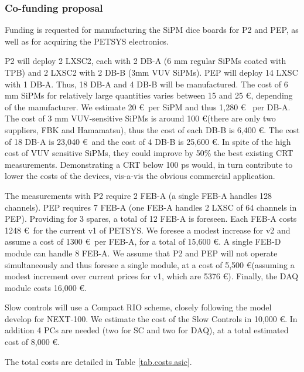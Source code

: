 \subsubsection*{Co-funding proposal}
Funding is requested for manufacturing the SiPM dice boards for P2 and PEP, as well as for acquiring the PETSYS
electronics. 

P2 will deploy 2 LXSC2, each with 2 DB-A (6 mm regular SiPMs coated with TPB) and 2 LXSC2 with 2 DB-B (3mm VUV SiPMs). PEP will deploy 14 LXSC with 1 DB-A. Thus, 18 DB-A and 4 DB-B  will be manufactured. The cost of 6 mm SiPMs for relatively large quantities varies between 15 and 25 \euro, depending of the manufacturer. We estimate 20 \euro ~per SiPM and thus 1,280 \euro 
~per DB-A. The cost of 3 mm VUV-sensitive SiPMs is around 100 \euro (there are only two suppliers, FBK and Hamamatsu), thus the cost of each DB-B is 6,400 \euro. The cost of 18 DB-A is 23,040 \euro\ and the cost
of 4 DB-B is 25,600 \euro. In spite of the high cost of VUV sensitive SiPMs, they could improve by 50\% the best existing CRT measurements. Demonstrating a CRT below 100 ps would, in turn contribute to lower the costs of the devices, vis-a-vis the obvious commercial application.

The measurements with P2 require 2 FEB-A (a single FEB-A handles 128 channels). PEP requires 7 FEB-A (one FEB-A handles 2 LXSC of 64 channels in PEP). Providing for 3 spares, a total of 12 FEB-A is foreseen. Each FEB-A costs 1248 \euro\ for the current v1 of PETSYS. We foresee a modest increase for v2 and assume a cost of 1300 \euro\ per FEB-A, for a total of 15,600 \euro. A single FEB-D module can handle 8 FEB-A. We assume that P2 and PEP will not operate simultaneously and thus foresee a single module, at a cost of 5,500 \euro (assuming a modest increment over current prices for v1, which are 5376 \euro). Finally, the DAQ module costs 16,000 \euro.

Slow controls will use a Compact RIO scheme, closely following the model develop for NEXT-100. We estimate the cost of the Slow Controls in 10,000 \euro. In addition 4 PCs are needed (two for SC and two for DAQ), at a total estimated cost of 8,000 \euro. 

The total costs are detailed in Table \ref{tab.costs.asic}.

